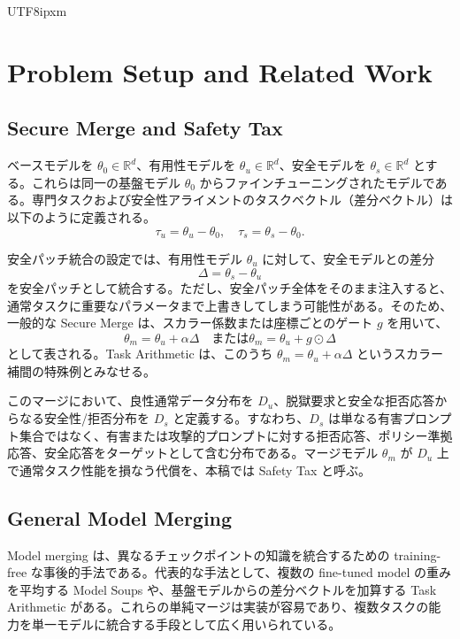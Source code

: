 \documentclass[letterpaper]{article} %
\begin{document}
\begin{CJK*}{UTF8}{ipxm}
\section{Problem Setup and Related Work}

\subsection{Secure Merge and Safety Tax}
ベースモデルを $\theta_0 \in \mathbb{R}^d$、有用性モデルを $\theta_u \in \mathbb{R}^d$、安全モデルを $\theta_s \in \mathbb{R}^d$ とする。これらは同一の基盤モデル $\theta_0$ からファインチューニングされたモデルである。専門タスクおよび安全性アライメントのタスクベクトル（差分ベクトル）は以下のように定義される。
\begin{equation}
\tau_u = \theta_u - \theta_0, \quad \tau_s = \theta_s - \theta_0.
\end{equation}

安全パッチ統合の設定では、有用性モデル $\theta_u$ に対して、安全モデルとの差分
\begin{equation}
\Delta = \theta_s - \theta_u
\end{equation}
を安全パッチとして統合する。ただし、安全パッチ全体をそのまま注入すると、通常タスクに重要なパラメータまで上書きしてしまう可能性がある。そのため、一般的な Secure Merge は、スカラー係数または座標ごとのゲート $g$ を用いて、
\begin{equation}
\theta_m = \theta_u + \alpha \Delta \quad \text{または} \theta_m = \theta_u + g \odot \Delta
\end{equation}
として表される。Task Arithmetic \citep{Ilharco2022EditingMW} は、このうち $\theta_m = \theta_u + \alpha \Delta$ というスカラー補間の特殊例とみなせる。

このマージにおいて、良性通常データ分布を $D_u$、脱獄要求と安全な拒否応答からなる安全性/拒否分布を $D_s$ と定義する。すなわち、$D_s$ は単なる有害プロンプト集合ではなく、有害または攻撃的プロンプトに対する拒否応答、ポリシー準拠応答、安全応答をターゲットとして含む分布である。マージモデル $\theta_m$ が $D_u$ 上で通常タスク性能を損なう代償を、本稿では Safety Tax と呼ぶ。

\subsection{General Model Merging}
Model merging は、異なるチェックポイントの知識を統合するための training-free な事後的手法である\citep{wortsman2022model, Ilharco2022EditingMW}。代表的な手法として、複数の fine-tuned model の重みを平均する Model Soups や、基盤モデルからの差分ベクトルを加算する Task Arithmetic がある。これらの単純マージは実装が容易であり、複数タスクの能力を単一モデルに統合する手段として広く用いられている。


\end{CJK*}
\end{document}
